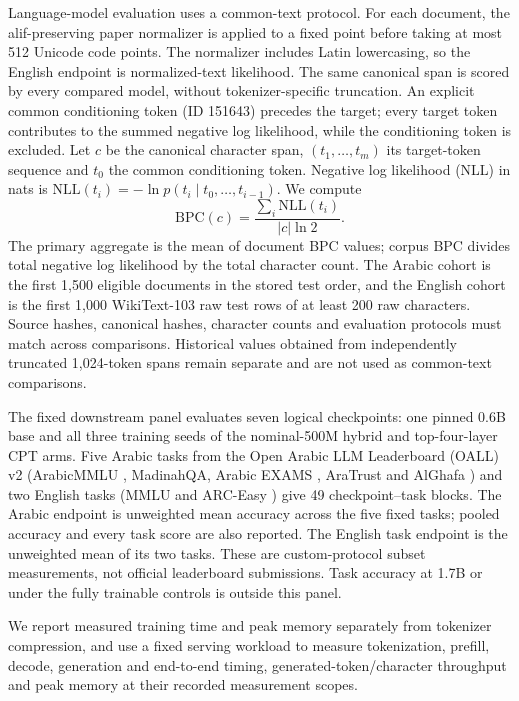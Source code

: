 \documentclass{ieeeaccess}
\begin{document}
Language-model evaluation uses a common-text protocol. For each document, the alif-preserving paper normalizer is applied to a fixed point before taking at most 512 Unicode code points. The normalizer includes Latin lowercasing, so the English endpoint is normalized-text likelihood. The same canonical span is scored by every compared model, without tokenizer-specific truncation. An explicit common conditioning token (ID 151643) precedes the target; every target token contributes to the summed negative log likelihood, while the conditioning token is excluded. Let $c$ be the canonical character span, $(t_1,\ldots,t_m)$ its target-token sequence and $t_0$ the common conditioning token. Negative log likelihood (NLL) in nats is $\mathrm{NLL}(t_i)=-\ln p(t_i\mid t_0,\ldots,t_{i-1})$. We compute
\begin{equation}
\mathrm{BPC}(c)=\frac{\sum_i\mathrm{NLL}(t_i)}{|c|\ln 2}.
\label{eq:bpc}
\end{equation}
The primary aggregate is the mean of document BPC values; corpus BPC divides total negative log likelihood by the total character count. The Arabic cohort is the first 1{,}500 eligible documents in the stored test order, and the English cohort is the first 1{,}000 WikiText-103 \cite{merity2017pointer} raw test rows of at least 200 raw characters. Source hashes, canonical hashes, character counts and evaluation protocols must match across comparisons. Historical values obtained from independently truncated 1{,}024-token spans remain separate and are not used as common-text comparisons.

The fixed downstream panel evaluates seven logical checkpoints: one pinned 0.6B base and all three training seeds of the nominal-500M hybrid and top-four-layer CPT arms. Five Arabic tasks from the Open Arabic LLM Leaderboard (OALL) v2 \cite{OALL-2} (ArabicMMLU \cite{koto2024arabicmmlu}, MadinahQA, Arabic EXAMS \cite{hardalov2020exams}, AraTrust \cite{alghamdi2024aratrust} and AlGhafa \cite{almazrouei2023alghafa}) and two English tasks (MMLU \cite{hendrycks2021measuring} and ARC-Easy \cite{clark2018arc}) give 49 checkpoint--task blocks. The Arabic endpoint is unweighted mean accuracy across the five fixed tasks; pooled accuracy and every task score are also reported. The English task endpoint is the unweighted mean of its two tasks. These are custom-protocol subset measurements, not official leaderboard submissions. Task accuracy at 1.7B or under the fully trainable controls is outside this panel.

We report measured training time and peak memory separately from tokenizer compression, and use a fixed serving workload to measure tokenization, prefill, decode, generation and end-to-end timing, generated-token/character throughput and peak memory at their recorded measurement scopes.
\end{document}
